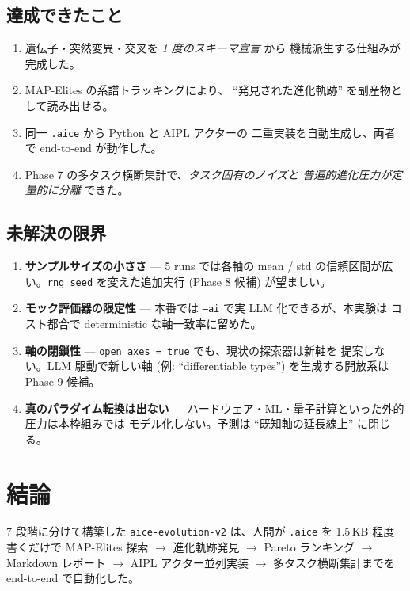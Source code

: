 \documentclass[a4paper,11pt]{article}
\begin{document}
\subsection{達成できたこと}

\begin{enumerate}
  \item 遺伝子・突然変異・交叉を {\itshape 1 度のスキーマ宣言} から
        機械派生する仕組みが完成した。
  \item MAP-Elites の系譜トラッキングにより、
        ``発見された進化軌跡'' を副産物として読み出せる。
  \item 同一 \texttt{.aice} から Python と AIPL アクターの
        二重実装を自動生成し、両者で end-to-end が動作した。
  \item Phase 7 の多タスク横断集計で、{\itshape タスク固有のノイズと
        普遍的進化圧力が定量的に分離} できた。
\end{enumerate}

\subsection{未解決の限界}

\begin{enumerate}
  \item {\bfseries サンプルサイズの小ささ} ---
        5 runs では各軸の mean / std の信頼区間が広い。\texttt{rng\_seed}
        を変えた追加実行 (Phase 8 候補) が望ましい。
  \item {\bfseries モック評価器の限定性} ---
        本番では \texttt{--ai} で実 LLM 化できるが、本実験は
        コスト都合で deterministic な軸一致率に留めた。
  \item {\bfseries 軸の閉鎖性} ---
        \texttt{open\_axes = true} でも、現状の探索器は新軸を
        提案しない。LLM 駆動で新しい軸 (例: ``differentiable
        types'') を生成する開放系は Phase 9 候補。
  \item {\bfseries 真のパラダイム転換は出ない} ---
        ハードウェア・ML・量子計算といった外的圧力は本枠組みでは
        モデル化しない。予測は ``既知軸の延長線上'' に閉じる。
\end{enumerate}

\section{結論}

7 段階に分けて構築した \texttt{aice-evolution-v2} は、人間が
\texttt{.aice} を 1.5\,KB 程度書くだけで MAP-Elites 探索 \(\to\)
進化軌跡発見 \(\to\) Pareto ランキング \(\to\) Markdown レポート
\(\to\) AIPL アクター並列実装 \(\to\) 多タスク横断集計までを
end-to-end で自動化した。
\end{document}
